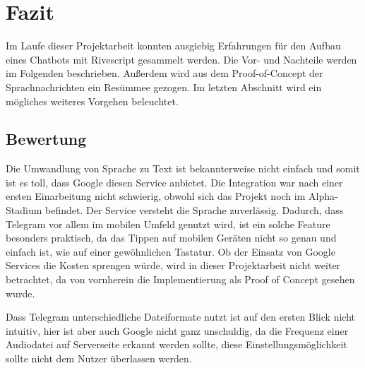 \chapter{Fazit}
Im Laufe dieser Projektarbeit konnten ausgiebig Erfahrungen für den Aufbau eines Chatbots mit Rivescript gesammelt werden. Die Vor- und Nachteile werden im Folgenden beschrieben. Außerdem wird aus dem Proof-of-Concept der Sprachnachrichten ein Resümmee gezogen. Im letzten Abschnitt wird ein mögliches weiteres Vorgehen beleuchtet.

\section{Bewertung}

Die Umwandlung von Sprache zu Text ist bekannterweise nicht einfach und somit ist es toll, dass Google diesen Service anbietet. Die Integration war nach einer ersten Einarbeitung nicht schwierig, obwohl sich das Projekt noch im Alpha-Stadium befindet. Der Service versteht die Sprache zuverlässig.
Dadurch, dass Telegram vor allem im mobilen Umfeld genutzt wird, ist ein solche Feature besonders praktisch, da das Tippen auf mobilen Geräten nicht so genau und einfach ist, wie auf einer gewöhnlichen Tastatur. Ob der Einsatz von Google Services die Kosten sprengen würde, wird in dieser Projektarbeit nicht weiter betrachtet, da von vornherein die Implementierung als Proof of Concept gesehen wurde.

Dass Telegram unterschiedliche Dateiformate nutzt ist auf den ersten Blick nicht intuitiv, hier ist aber auch Google nicht ganz unschuldig, da die Frequenz einer Audiodatei auf Serverseite erkannt werden sollte, diese Einstellungsmöglichkeit sollte nicht dem Nutzer überlassen werden.

